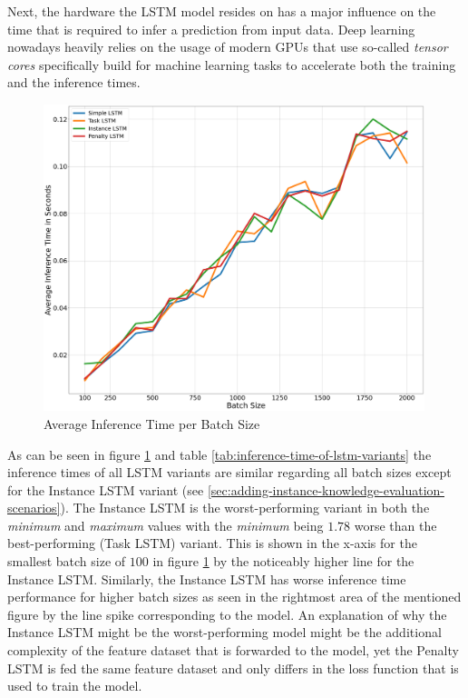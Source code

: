     Next, the hardware the LSTM model resides on has a major influence on the time that is required to infer a prediction from input data. Deep learning nowadays heavily relies on the usage of modern GPUs that use so-called \emph{tensor cores} specifically build for machine learning tasks to accelerate both the training and the inference times.
    \begin{figure}
      \centering
      \includegraphics[width=0.99\textwidth]{figures/inference_time_batch_size.png}
      \caption{Average Inference Time per Batch Size}
      \label{fig:average-inference-time-per-batch-size}
    \end{figure}

    As can be seen in figure \ref{fig:average-inference-time-per-batch-size} and table \ref{tab:inference-time-of-lstm-variants} the inference times of all LSTM variants are similar regarding all batch sizes except for the Instance LSTM variant (see \ref{sec:adding-instance-knowledge-evaluation-scenarios}). 
    The Instance LSTM is the worst-performing variant in both the \emph{minimum} and \emph{maximum} values with the \emph{minimum} being $1.78$ worse than the best-performing (Task LSTM) variant. This is shown in the x-axis for the smallest batch size of $100$ in figure \ref{fig:average-inference-time-per-batch-size} by the noticeably higher line for the Instance LSTM.
    Similarly, the Instance LSTM has worse inference time performance for higher batch sizes as seen in the rightmost area of the mentioned figure by the line spike corresponding to the model.
    An explanation of why the Instance LSTM might be the worst-performing model might be the additional complexity of the feature dataset that is forwarded to the model, yet the Penalty LSTM is fed the same feature dataset and only differs in the loss function that is used to train the model.
    
